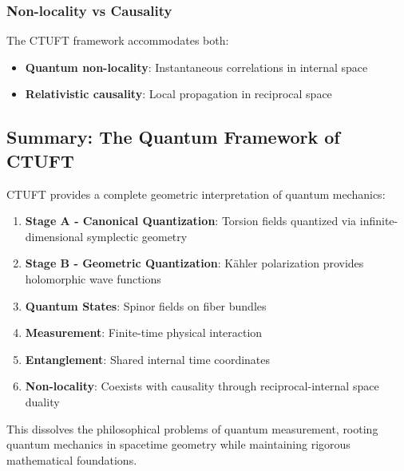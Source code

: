 \subsubsection{Non-locality vs Causality}

The CTUFT framework accommodates both:
\begin{itemize}
    \item \textbf{Quantum non-locality}: Instantaneous correlations in internal space
    \item \textbf{Relativistic causality}: Local propagation in reciprocal space
\end{itemize}

\subsection{Summary: The Quantum Framework of CTUFT}

CTUFT provides a complete geometric interpretation of quantum mechanics:

\begin{enumerate}
    \item \textbf{Stage A - Canonical Quantization}: Torsion fields quantized via infinite-dimensional symplectic geometry
    \item \textbf{Stage B - Geometric Quantization}: Kähler polarization provides holomorphic wave functions
    \item \textbf{Quantum States}: Spinor fields on fiber bundles
    \item \textbf{Measurement}: Finite-time physical interaction
    \item \textbf{Entanglement}: Shared internal time coordinates
    \item \textbf{Non-locality}: Coexists with causality through reciprocal-internal space duality
\end{enumerate}

This dissolves the philosophical problems of quantum measurement, rooting quantum mechanics in spacetime geometry while maintaining rigorous mathematical foundations.
